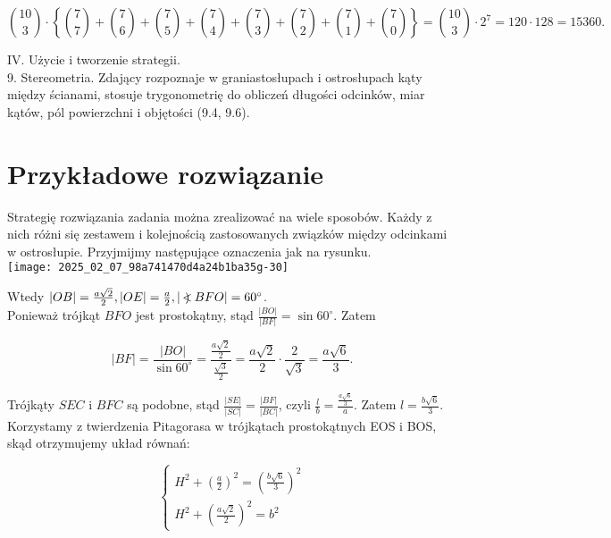 \documentclass[10pt]{article}
\newcommand\Varangle{\mathop{{<\!\!\!\!\!\text{\small)}}\:}\nolimits}
\begin{document}
$$
\binom{10}{3} \cdot\left\{\binom{7}{7}+\binom{7}{6}+\binom{7}{5}+\binom{7}{4}+\binom{7}{3}+\binom{7}{2}+\binom{7}{1}+\binom{7}{0}\right\}=\binom{10}{3} \cdot 2^{7}=120 \cdot 128=15360 .
$$

IV. Użycie i tworzenie strategii.\\
9. Stereometria. Zdający rozpoznaje w graniastosłupach i ostrosłupach kąty między ścianami, stosuje trygonometrię do obliczeń długości odcinków, miar kątów, pól powierzchni i objętości (9.4, 9.6).

\section*{Przykładowe rozwiązanie}
Strategię rozwiązania zadania można zrealizować na wiele sposobów. Każdy z nich różni się zestawem i kolejnością zastosowanych związków między odcinkami w ostrosłupie. Przyjmijmy następujące oznaczenia jak na rysunku.\\
\texttt{[image: 2025\_02\_07\_98a741470d4a24b1ba35g-30]}

Wtedy $|O B|=\frac{a \sqrt{2}}{2},|O E|=\frac{a}{2},|\Varangle B F O|=60^{\circ}$.\\
Ponieważ trójkąt $B F O$ jest prostokątny, stąd $\frac{|B O|}{|B F|}=\sin 60^{\circ}$. Zatem

$$
|B F|=\frac{|B O|}{\sin 60^{\circ}}=\frac{\frac{a \sqrt{2}}{2}}{\frac{\sqrt{3}}{2}}=\frac{a \sqrt{2}}{2} \cdot \frac{2}{\sqrt{3}}=\frac{a \sqrt{6}}{3} .
$$

Trójkąty $S E C$ i $B F C$ są podobne, stąd $\frac{|S E|}{|S C|}=\frac{|B F|}{|B C|}$, czyli $\frac{l}{b}=\frac{\frac{a \sqrt{6}}{3}}{a}$. Zatem $l=\frac{b \sqrt{6}}{3}$.\\
Korzystamy z twierdzenia Pitagorasa w trójkątach prostokątnych EOS i BOS, skąd otrzymujemy układ równań:

$$
\left\{\begin{array}{l}
H^{2}+\left(\frac{a}{2}\right)^{2}=\left(\frac{b \sqrt{6}}{3}\right)^{2} \\
H^{2}+\left(\frac{a \sqrt{2}}{2}\right)^{2}=b^{2}
\end{array}\right.
$$
\end{document}
